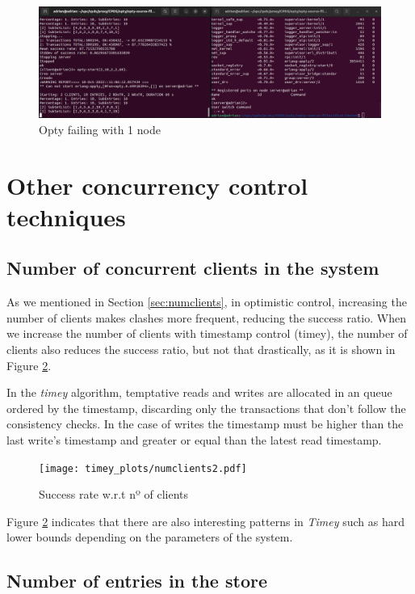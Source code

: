 \documentclass[a4paper, 10pt]{article}
\begin{document}
\begin{figure}[H]
  \centering
  \includegraphics[width=0.95\linewidth]{images/opty1node.png}
    \caption{Opty failing with 1 node}
    \label{fig:1node}
\end{figure} 

\clearpage
\section{Other concurrency control techniques}


\subsection{Number of concurrent clients in the system}\label{timey-current-clients}

As we mentioned in Section \ref{sec:numclients}, in optimistic control, increasing the number of clients makes clashes more frequent, reducing the success ratio. When we increase the number of clients with timestamp control (timey), the number of clients also reduces the success ratio, but not that drastically, as it is shown in Figure \ref{timey:numclients}. 

In the \textit{timey} algorithm, temptative reads and writes are allocated in an queue ordered by the timestamp, discarding only the transactions that don't follow the consistency checks. In the case of writes the timestamp must be higher than the last write's timestamp and greater or equal than the latest read timestamp.

\begin{figure}[H]
  \centering
  \texttt{[image: timey\_plots/numclients2.pdf]}
    \caption{Success rate w.r.t nº of clients}
    \label{timey:numclients}
\end{figure} 

Figure \ref{timey:numclients} indicates that there are also interesting patterns in \textit{Timey} such as hard lower bounds depending on the parameters of the system.

\clearpage
\subsection{Number of entries in the store}
\end{document}

